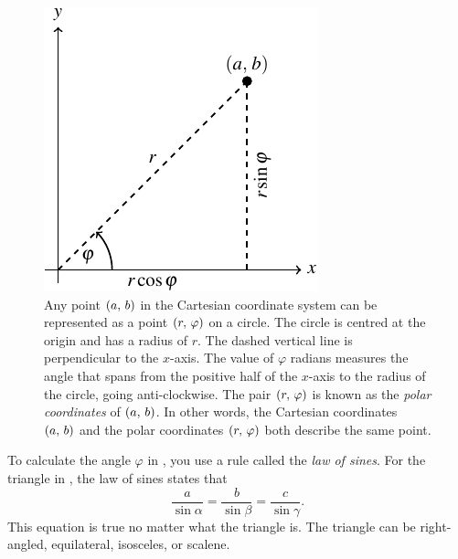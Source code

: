 \documentclass[a4paper,oneside,12pt]{article}
\begin{document}
\begin{figure}[!htbp]
\centering
\includegraphics[scale=1.1]{image/04/polar-cartesian.pdf}
\caption{%
  Any point $\left\lparen{a},\, {b}\right\rparen$ in the Cartesian coordinate system can be
  represented as a point $\left\lparen{r},\, {\varphi}\right\rparen$ on a circle.  The circle
  is centred at the origin and has a radius of $r$.  The dashed
  vertical line is perpendicular to the $x$-axis.  The value of
  $\varphi$ radians measures the angle that spans from the positive
  half of the $x$-axis to the radius of the circle, going
  anti-clockwise.  The pair $\left\lparen{r},\, {\varphi}\right\rparen$ is known as the
  \emph{polar coordinates} of $\left\lparen{a},\, {b}\right\rparen$.  In other words, the
  Cartesian coordinates $\left\lparen{a},\, {b}\right\rparen$ and the polar coordinates
  $\left\lparen{r},\, {\varphi}\right\rparen$ both describe the same point.
}
\label{fig:convert_from_polar_to_Cartesian_coordinates}
\end{figure}

To calculate the angle $\varphi$ in
, you use a
rule called the \emph{law of sines}.  For the triangle in
, the law of sines states that
\[
\frac{a}{\sin\alpha}
=
\frac{b}{\sin\beta}
=
\frac{c}{\sin\gamma}.
\]
This equation is true no matter what the triangle is.  The triangle
can be right-angled, equilateral, isosceles, or scalene.
\end{document}
